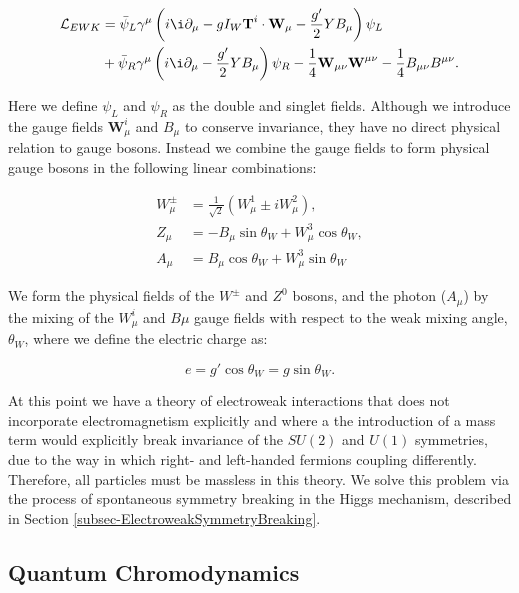 \begin{equation}
\begin{split}
\lumi_{EWK} & = \bar{\psi}_L \gamma^{\mu} \left(i \i\partial_{\mu} - g I_W \textbf{T}^i \cdot \textbf{W}_{\mu} - \frac{g'}{2} Y B_{\mu}\right)\psi_L \\
& + \bar{\psi}_R \gamma^{\mu}\left(i \i\partial_{\mu} - \frac{g'}{2} Y B_{\mu}\right)\psi_R - \frac{1}{4}\textbf{W}_{\mu \nu}\textbf{W}^{\mu \nu} - \frac{1}{4} B_{\mu \nu} B^{\mu \nu} .
\end{split}
\end{equation}

Here we define $\psi_L$ and $\psi_R$ as the double and singlet fields. Although we introduce the gauge fields $\textbf{W}^i_{\mu}$ and $ B_{\mu}$ to conserve invariance, they have no direct physical relation to gauge bosons. Instead we combine the gauge fields to form physical gauge bosons in the following linear combinations:

\begin{align}
W^{\pm}_{\mu} & = \frac{1}{\sqrt{2}}(W^1_{\mu} \pm iW^2_{\mu}), \\
Z_{\mu} & = -B_{\mu}\sin\theta_W + W^3_{\mu}\cos\theta_W, \\
A_{\mu} & = B_{\mu}\cos\theta_W + W^3_{\mu}\sin\theta_W
\end{align}   

We form the physical fields of the $W^{\pm}$ and $Z^0$ bosons, and the photon ($A_{\mu}$) by the mixing of the $W^i_{\mu}$ and $B{\mu}$ gauge fields with respect to the weak mixing angle, $\theta_W$, where we define the electric charge as:

\begin{equation}
e = g'\cos\theta_W = g \sin\theta_W.
\end{equation}

At this point we have a theory of electroweak interactions that does not incorporate electromagnetism explicitly and where a the introduction of a mass term would explicitly break invariance of the $SU(2)$ and $U(1)$ symmetries, due to the way in which right- and left-handed fermions coupling differently. Therefore, all particles must be massless in this theory. We solve this problem via the process of spontaneous symmetry breaking in the Higgs mechanism, described in Section \ref{subsec-ElectroweakSymmetryBreaking}.  

\subsection{Quantum Chromodynamics} \label{subsec-QuantumChromodynamics}

